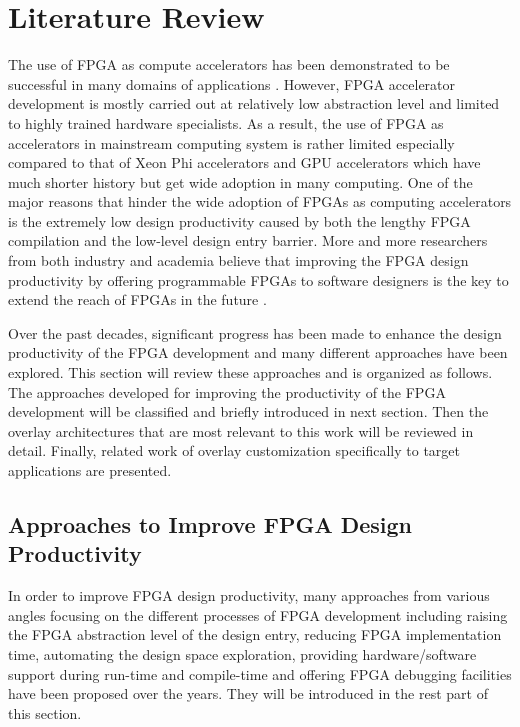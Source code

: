 \chapter{Literature Review} \label{chapter:litrev}
The use of FPGA as compute accelerators has been demonstrated to be successful in many domains of applications \cite{iouliia2004reconfigurable, souradip2010hardware, asano2009performance, che2008accelerating, thomas2009comparison}. However, FPGA accelerator development is mostly carried out at relatively low abstraction level and limited to highly trained hardware specialists. As a result, the use of FPGA as accelerators in mainstream computing system is rather limited especially compared to that of Xeon Phi accelerators and GPU accelerators \cite{top500} which have much shorter history but get wide adoption in many computing. One of the major reasons that hinder the wide adoption of FPGAs as computing accelerators is the extremely low design productivity caused by both the lengthy FPGA compilation and the low-level design entry barrier. More and more researchers from both industry and academia believe that improving the FPGA design productivity by offering programmable FPGAs to software designers is the key to extend the reach of FPGAs in the future \cite{cong2011high, raje2015fpl, fsp2015, fsp2014, olaf2013}. 

Over the past decades, significant progress has been made to enhance the design productivity of the FPGA development and many different approaches have been explored. This section will review these approaches and is organized as follows. The approaches developed for improving the productivity of the FPGA development will be classified and briefly introduced in next section. Then the overlay architectures that are most relevant to this work will be reviewed in detail. Finally, related work of overlay customization specifically to target applications are presented.

\section{Approaches to Improve FPGA Design Productivity}
In order to improve FPGA design productivity, many approaches from various angles focusing on the different processes of FPGA development including raising the FPGA abstraction level of the design entry, reducing FPGA implementation time, automating the design space exploration, providing hardware/software support during run-time and compile-time and offering FPGA debugging facilities have been proposed over the years. They will be introduced in the rest part of this section. 

